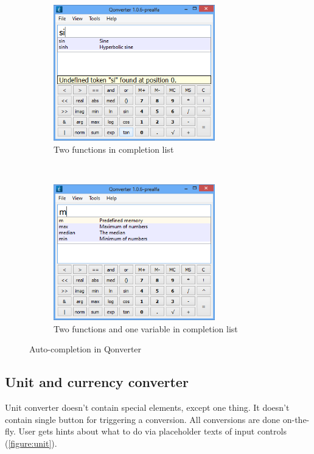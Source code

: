 \begin{figure}[ht]
\centering
\begin{subfigure}[t]{0.48\textwidth}
\centering
\includegraphics[width=7cm]{graphics/real-world/08-complete1.png}
\caption{Two functions in completion list}
\end{subfigure}
~
\begin{subfigure}[t]{0.48\textwidth}
\centering
\includegraphics[width=7cm]{graphics/real-world/08-complete2.png}
\caption{Two functions and one variable in completion list}
\end{subfigure}
\caption{Auto-completion in Qonverter}\label{figure:autoq}
\end{figure}

\subsection{Unit and currency converter}
Unit converter doesn't contain special elements, except one thing. It doesn't contain single button for triggering a conversion. All conversions are done on-the-fly. User gets hints about what to do via placeholder texts of input controls (\autoref{figure:unit}).


